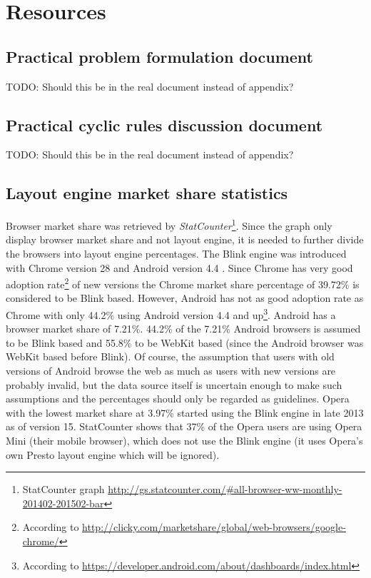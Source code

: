 \documentclass[a4paper,11pt]{kth-mag}
\begin{document}
      \chapter{Resources}
        \section{Practical problem formulation document}\label{sec:problem-formulation}
          TODO: Should this be in the real document instead of appendix?          
        \section{Practical cyclic rules discussion document}\label{sec:cyclic-rules}
          TODO: Should this be in the real document instead of appendix?
        \section{Layout engine market share statistics}\label{sec:layout_engines_market_share}
          Browser market share was retrieved by \emph{StatCounter}\footnote{StatCounter graph \url{http://gs.statcounter.com/#all-browser-ww-monthly-201402-201502-bar}}.
          Since the graph only display browser market share and not layout engine, it is needed to further divide the browsers into layout engine percentages.
          The Blink engine was introduced with Chrome version 28 and Android version 4.4 \cite{wiki_blink}.
          Since Chrome has very good adoption rate\footnote{According to \url{http://clicky.com/marketshare/global/web-browsers/google-chrome/}} of new versions the Chrome market share percentage of 39.72\% is considered to be Blink based.
          However, Android has not as good adoption rate as Chrome with only 44.2\% using Android version 4.4 and up\footnote{According to \url{https://developer.android.com/about/dashboards/index.html}}.
          Android has a browser market share of 7.21\%. 44.2\% of the 7.21\% Android browsers is assumed to be Blink based and 55.8\% to be WebKit based (since the Android browser was WebKit based before Blink).
          Of course, the assumption that users with old versions of Android browse the web as much as users with new versions are probably invalid, but the data source itself is uncertain enough to make such assumptions and the percentages should only be regarded as guidelines.
          Opera with the lowest market share at 3.97\% started using the Blink engine in late 2013 as of version 15.
          StatCounter shows that 37\% of the Opera users are using Opera Mini (their mobile browser), which does not use the Blink engine (it uses Opera's own Presto layout engine which will be ignored).
\end{document}
